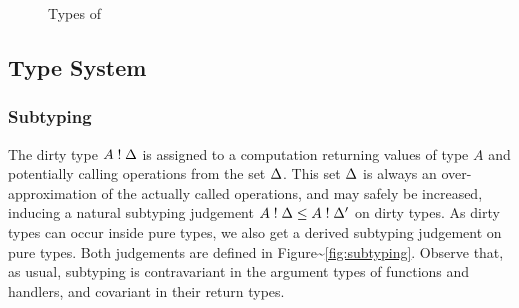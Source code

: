 \documentclass[sigplan,10pt]{acmart}\settopmatter{printfolios=true}
\begin{document}
\begin{figure}[h]
\begin{center}
\end{center}
\caption{Types of \eff}\label{fig:types:eff}
\end{figure}

\subsection{Type System}\label{type-system}

\subsubsection{Subtyping}\label{subtyping}

The dirty type \(A \mathrel{!} \Delta\) is assigned to a computation returning
values of type \(A\) and potentially calling operations from the set
\(\Delta\). This set \(\Delta\) is always an over-approximation of the
actually called operations, and may safely be increased, inducing a
natural subtyping judgement \(A \mathrel{!} \Delta \leq A \mathrel{!} \Delta'\) on dirty
types. As dirty types can occur inside pure types, we also get a derived
subtyping judgement on pure types. Both judgements are defined in
Figure\textasciitilde{}\ref{fig:subtyping}. Observe that, as usual,
subtyping is contravariant in the argument types of functions and
handlers, and covariant in their return types.
\end{document}
